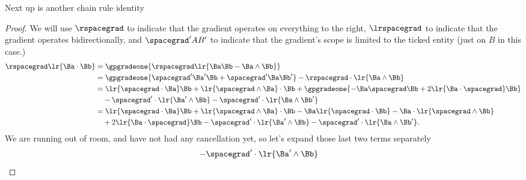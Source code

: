 Next up is another chain rule identity
\begin{proof}
We will use \( \rspacegrad \) to indicate that the gradient operates on everything to the right, \( \lrspacegrad \) to indicate that the gradient operates bidirectionally, and \( \spacegrad' A B' \) to indicate that the gradient's scope is limited to the ticked entity (just on \( B \) in this case.)
\begin{equation}\label{eqn:vectorcalc:760}
\begin{aligned}
\rspacegrad \lr{ \Ba \cdot \Bb }
&=
\gpgradeone{
\rspacegrad \lr{ \Ba \Bb - \Ba \wedge \Bb }
} \\
&=
\gpgradeone{
\spacegrad' \Ba' \Bb
+
\spacegrad' \Ba \Bb'
}
- \rspacegrad \cdot \lr{ \Ba \wedge \Bb }
\\
&=
\lr{ \spacegrad \cdot \Ba} \Bb
+
\lr{ \spacegrad \wedge \Ba} \cdot \Bb
+
\gpgradeone{
- \Ba \spacegrad \Bb + 2 \lr{ \Ba \cdot \spacegrad } \Bb
} \\
&\quad
- \spacegrad' \cdot \lr{ \Ba' \wedge \Bb }
- \spacegrad' \cdot \lr{ \Ba \wedge \Bb' }
\\
&=
\lr{ \spacegrad \cdot \Ba} \Bb
+
\lr{ \spacegrad \wedge \Ba} \cdot \Bb
-
\Ba \lr{ \spacegrad \cdot \Bb }
-
\Ba \cdot \lr{ \spacegrad \wedge \Bb } \\
&\quad
+ 2 \lr{ \Ba \cdot \spacegrad } \Bb
- \spacegrad' \cdot \lr{ \Ba' \wedge \Bb }
- \spacegrad' \cdot \lr{ \Ba \wedge \Bb' }.
\end{aligned}
\end{equation}
We are running out of room, and have not had any cancellation yet, so let's expand those last two terms separately
\begin{equation}\label{eqn:vectorcalc:780}
\begin{aligned}
- \spacegrad' &\cdot \lr{ \Ba' \wedge \Bb }

\end{aligned}
\end{equation}
\end{proof}
